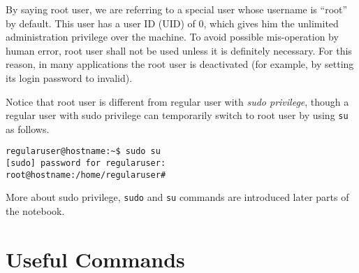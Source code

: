 By saying root user, we are referring to a special user whose username is ``root'' by default. This user has a user ID (UID) of $0$, which gives him the unlimited administration privilege over the machine. To avoid possible mis-operation by human error, root user shall not be used unless it is definitely necessary. For this reason, in many applications the root user is deactivated (for example, by setting its login password to invalid).

Notice that root user is different from regular user with \textit{sudo privilege}, though a regular user with sudo privilege can temporarily switch to root user by using \verb|su| as follows.
\begin{verbatim}
regularuser@hostname:~$ sudo su
[sudo] password for regularuser:
root@hostname:/home/regularuser#
\end{verbatim}

More about sudo privilege, \verb|sudo| and \verb|su| commands are introduced later parts of the notebook.

\section{Useful Commands}

















